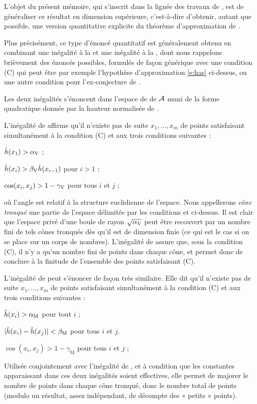 L'objet du présent mémoire, qui s'inscrit dans la lignée des travaux de
, est de généraliser ce résultat en dimension supérieure,
c'est-à-dire d'obtenir, autant que possible, une version quantitative
explicite du théorème d'approximation de .

\medskip

Plus précisément, ce type d'énoncé quantitatif est généralement obtenu en
combinant une inégalité à la  et une inégalité à la ,
dont nous rappelons brièvement des énoncés possibles, formulés de façon
générique avec une condition (C) qui peut être par exemple l'hypothèse
d'approximation \eqref{e:has} ci-dessus, ou une autre condition pour
l'ex-conjecture de .

Les deux inégalités s'énoncent dans l'espace de  de \( \mathcal A \)
muni de la forme quadratique donnée par la hauteur normalisée de
.

L'inégalité de  affirme qu'il n'existe pas de suite \( x_1, \dots,
  x_m \) de points satisfaisant simultanément à la condition (C) et aux trois
conditions suivantes :
\begin{enumthm}
  \item \( \hat h (x_1) > \alpha \sb{\mathrm{V}} \) ; \label{i:grand}
  \item \( \hat h (x_i) > \beta \sb{\mathrm{V}} \hat h (x_{i-1}) \) pour \( i > 1 \) ;
  \item \( \cos(x_i, x_j) > 1 - \gamma \sb{\mathrm{V}} \) pour tous \( i \) et \( j \) ;
    \label{i:proche}
\end{enumthm}
où l'angle est relatif à la structure euclidienne de l'espace. Nous
appellerons \emph{cône tronqué} une partie de l'espace délimitée par les
conditions  et  ci-dessus. Il est clair que
l'espace privé d'une boule de rayon \( \sqrt{\alpha \sb{\mathrm{V}}} \) peut être recouvert
par un nombre fini de tels cônes tronqués dès qu'il est de dimension finie (ce
qui est le cas si on se place sur un corps de nombres). L'inégalité de
 assure que, sous la condition (C), il n'y a qu'un nombre fini de
points dans chaque cône, et permet donc de conclure à la finitude de
l'ensemble des points satisfaisant (C).

L'inégalité de  peut s'énoncer de façon très similaire. Elle dit
qu'il n'existe pas de suite \( x_1, \dots, x_m \) de points satisfaisant
simultanément à la condition (C) et aux trois conditions suivantes :
\begin{enumthm}
  \newcommand\mum{_{\mathrm M}}
  \item \( \hautn{x_i} > \alpha\mum \) pour tout \( i \) ;
  \item \( \abs{ \hautn{x_i} - \hautn{x_j} } < \beta\mum \) pour tous \( i \) et
    \( j \).
  \item \( \cos(x_i, x_j) > 1 - \gamma\mum \) pour tous \( i \) et \( j \) ;
\end{enumthm}
Utilisée conjointement avec l'inégalité de , et à condition que les
constantes apparaissant dans ces deux inégalités soient effectives, elle
permet de majorer le nombre de points dans chaque cône tronqué, donc le nombre
total de points (modulo un résultat, assez indépendant, de décompte des «
petits » points).

